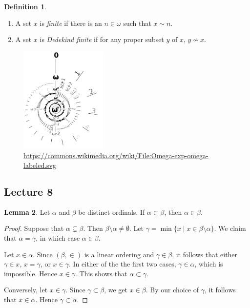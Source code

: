 \documentclass[10pt,letterpaper,cm]{nupset}
\theoremstyle{definition}
\newtheorem{definition}{Definition}[subsection]
\theoremstyle{theorem}
\newtheorem{lemma}[definition]{Lemma}
\theoremstyle{remark}
\newcommand{\1}{\mathbf{1}}
\newcommand{\0}{\vec 0}
\begin{document}
\begin{definition} $ $
\begin{enumerate}
\item A set $x$ is \textit{finite}  if there is an $n \in \omega$ such that $x \sim n$.
\item A set $x$ is \textit{Dedekind finite} if for any proper subset $y$ of $x$, $y \not \sim x$.
\end{enumerate}
\end{definition}

\begin{figure}[H]
\centering
\includegraphics[width=43mm]{ordinal-spiral.png}
\caption{\url{https://commons.wikimedia.org/wiki/File:Omega-exp-omega-labeled.svg}}
\end{figure}

\subsection{Lecture 8}

\begin{lemma}\label{alt-def}
Let $\alpha$ and $\beta$ be distinct ordinals. If $\alpha \subset \beta$, then $\alpha \in \beta$.
\end{lemma}
\begin{proof}
Suppose that $\alpha \subsetneq \beta$. Then $\beta \setminus \alpha \ne \emptyset$. Let $\gamma = \min\{x \mid x \in \beta \setminus \alpha\}$. We claim that $\alpha = \gamma$, in which case $\alpha \in \beta$. 

\smallskip
Let $x \in \alpha$. Since $\left(\beta, \in\right)$ is a linear ordering and $\gamma \in \beta$, it follows that either $\gamma \in x$, $x= \gamma$, or $x \in \gamma$. In either of the the first two cases, $\gamma \in \alpha$, which is impossible. Hence $x \in \gamma$. This shows that $\alpha \subset \gamma$.  

\smallskip
 Conversely, let $x \in \gamma$. Since $\gamma \subset \beta$, we get $x \in \beta$. By our choice of $\gamma$, it follows that $x \in \alpha$. Hence $\gamma \subset \alpha$.
\end{proof}
\end{document}
